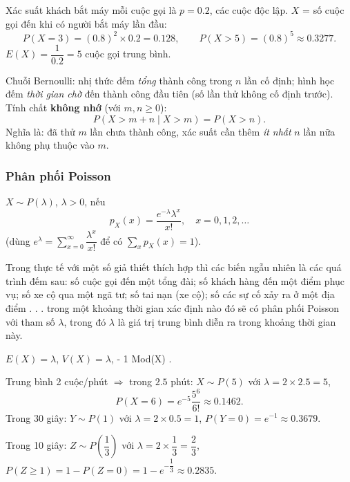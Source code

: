 \documentclass[12pt,a4paper]{article}
\begin{document}
\begin{vidu}[title={Gọi khách hàng}]
Xác suất khách bắt máy mỗi cuộc gọi là $p = 0.2$, các cuộc độc lập. $X$ = số cuộc gọi đến khi có người bắt máy lần đầu:
\[
  P(X = 3) = (0.8)^2 \times 0.2 = 0.128, \qquad
  P(X > 5) = (0.8)^5 \approx 0.3277.
\]
$E(X) = \dfrac{1}{0.2} = 5$ cuộc gọi trung bình.
\end{vidu}

\begin{luuy}[title={Liên hệ với nhị thức và ``không nhớ''}]
  Chuỗi Bernoulli: nhị thức đếm \emph{tổng} thành công trong $n$ lần cố định; hình học đếm \emph{thời gian chờ} đến thành công đầu tiên (số lần thử không cố định trước).
  Tính chất \textbf{không nhớ} (với $m, n \ge 0$):
  \[
    P(X > m + n \mid X > m) = P(X > n).
  \]
  Nghĩa là: đã thử $m$ lần chưa thành công, xác suất cần thêm \emph{ít nhất} $n$ lần nữa không phụ thuộc vào $m$.
\end{luuy}

\subsubsection{Phân phối Poisson}

\begin{dinhnghia}
  $X \sim P(\lambda)$, $\lambda > 0$, nếu
  \[
    p_X(x) = \dfrac{e^{-\lambda}\lambda^x}{x!}, \quad x = 0, 1, 2, \ldots
  \]
  (dùng $e^\lambda = \displaystyle\sum_{x=0}^{\infty} \dfrac{\lambda^x}{x!}$ để có $\displaystyle\sum_x p_X(x) = 1$).
\end{dinhnghia}

\begin{ynghia}
  Trong thực tế với một số giả thiết thích hợp thì các biến ngẫu nhiên là các quá trình đếm sau: số cuộc gọi đến một tổng đài; số khách hàng đến một điểm phục vụ; số xe cộ qua một ngã tư; số tai nạn (xe cộ); số các sự cố xảy ra ở một địa điểm . . . trong một khoảng thời gian xác định nào đó sẽ có phân phối Poisson với tham số $\lambda$, trong đó $\lambda$ là giá trị trung bình diễn ra trong khoảng thời gian này.
\end{ynghia}

\begin{dinhly}
  $E(X) = \lambda$, \quad $V(X) = \lambda$, \quad \lambda - 1 \le Mod(X) \le \lambda.
\end{dinhly}

\begin{vidu}[title={Cuộc gọi tổng đài}]
Trung bình 2 cuộc/phút $\Rightarrow$ trong $2.5$ phút: $X \sim P(5)$ với $\lambda = 2 \times 2.5 = 5$,
\[
  P(X = 6) = e^{-5}\dfrac{5^6}{6!} \approx 0.1462.
\]
Trong 30 giây: $Y \sim P(1)$ với $\lambda = 2 \times 0.5 = 1$, $P(Y = 0) = e^{-1} \approx 0.3679$.

Trong 10 giây: $Z \sim P(\dfrac{1}{3})$ với $\lambda = 2 \times \dfrac{1}{3} = \dfrac{2}{3}$, $P(Z \ge 1) = 1 - P(Z = 0) = 1 - e^{-\dfrac{1}{3}} \approx 0.2835$.
\end{vidu}
\end{document}
